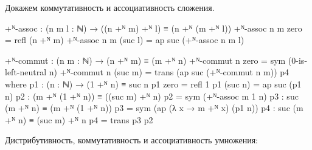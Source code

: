 \documentclass{article}[12pt]
\begin{document}
Докажем коммутативность и ассоциативность сложения.
\begin{code}
+ᴺ-assoc : (n m l : ℕ) → ((n +ᴺ m) +ᴺ l) ≡ (n +ᴺ (m +ᴺ l))
+ᴺ-assoc n m zero = refl (n +ᴺ m)
+ᴺ-assoc n m (suc l) = ap suc (+ᴺ-assoc n m l)

+ᴺ-commut : (n m : ℕ) → (n +ᴺ m) ≡ (m +ᴺ n)
+ᴺ-commut n zero = sym (0-is-left-neutral n)
+ᴺ-commut n (suc m) = trans (ap suc (+ᴺ-commut n m)) p4
    where
        p1 : (n : ℕ) → (1 +ᴺ n) ≡ suc n
        p1 zero = refl 1
        p1 (suc n) = ap suc (p1 n)
        p2 : (m +ᴺ (1 +ᴺ n)) ≡ ((suc m) +ᴺ n)
        p2 = sym (+ᴺ-assoc m 1 n)
        p3 : suc (m +ᴺ n) ≡ (m +ᴺ (1 +ᴺ n))
        p3 = sym (ap (λ x → m +ᴺ x) (p1 n))
        p4 : suc (m +ᴺ n) ≡ (suc m) +ᴺ n
        p4 = trans p3 p2
\end{code}
Дистрибутивность, коммутативность и ассоциативность умножения:
\end{document}
